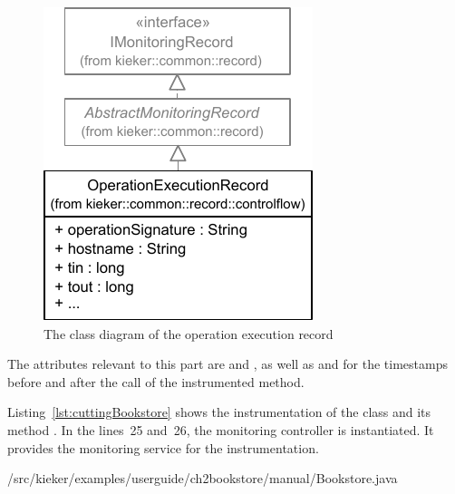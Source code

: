 \begin{figure}[H]
\begin{centering}
\includegraphics[scale=1]{images/kieker_OperationExecutionRecord-notraceattributes-inheritance}%
\caption{The class diagram of the operation execution record}
\label{fig:OperationExecutionRecordClassDiagram}
\end{centering}
\end{figure}

\noindent The attributes relevant to this part are  and , %
as well as  and  for %
the timestamps before and after the call of the instrumented method.

\enlargethispage{1.2cm}

Listing~\ref{lst:cuttingBookstore} shows the instrumentation of the  class and its method . In the lines~25 and~26, the monitoring controller is instantiated. It provides the monitoring service for the instrumentation.


\setJavaCodeListing
%
{\manualInstrumentedBookstoreApplicationDir/src/kieker/examples/userguide/ch2bookstore/manual/Bookstore.java}

